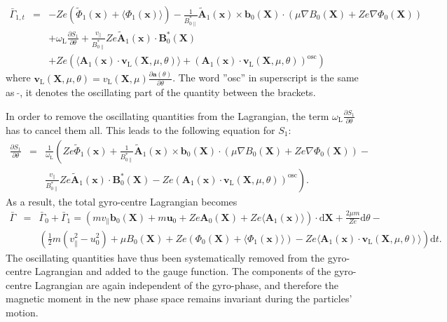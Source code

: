 \documentclass[a4paper,10pt]{article}
\newcommand{\st}[1]{\mathrm{#1}} %
\renewcommand{\vec}[1]{\mathbf{#1}}
\begin{document}
\begin{eqnarray*}
	\bar{\Gamma}_{1,t} &=& - Z e \left( \widetilde{\Phi}_1(\mathbf{x}) + \langle \Phi_1(\mathbf{x})\rangle \right) - \frac{1}{B_{0 \parallel}^{*}} \widetilde{\vec{A}}_1(\vec{x}) \times \mathbf{b}_0(\mathbf{X}) \cdot \left( \mu \nabla B_0(\mathbf{X}) + Z e \nabla \Phi_0(\mathbf{X})\right) \\ 
	&& + \omega_{\st{L}} \frac{\partial S_1}{\partial \theta} + \frac{v_{\parallel}}{B_{0 \parallel}^{*}} Z e \widetilde{\vec{A}}_1(\vec{x}) \cdot \mathbf{B}_0^{*}(\mathbf{X}) \\
	&& + Z e \left( \langle \mathbf{A}_1(\mathbf{x}) \cdot \vec{v}_{\st{L}}(\mathbf{X},\mu,\theta) \rangle  + \left( \mathbf{A}_1(\mathbf{x}) \cdot \vec{v}_{\st{L}}(\mathbf{X},\mu,\theta) \right)^{\st{osc}} \right)
\end{eqnarray*}
where $\vec{v}_{\st{L}}(\mathbf{X},\mu,\theta) = v_{\st{L}}(\mathbf{X},\mu) \frac{\partial \mathbf{a}(\theta)}{\partial \theta}$. The word ''osc'' in superscript is the same as $\ \widetilde{}$, it denotes the oscillating part of the quantity between the brackets. 

In order to remove the oscillating quantities from the Lagrangian, the term $\omega_{\st{L}} \frac{\partial S_1}{\partial \theta}$ has to cancel them all. This leads to the following equation for $S_1$:
\begin{eqnarray*}
	\frac{\partial S_1}{\partial \theta} &=& \frac{1}{\omega_{\st{L}}} \left( Z e \widetilde{\Phi}_1(\mathbf{x}) + \frac{1}{B_{0 \parallel}^{*}} \widetilde{\vec{A}}_1(\vec{x}) \times \mathbf{b}_0(\mathbf{X}) \cdot \left( \mu \nabla B_0(\mathbf{X}) + Z e \nabla \Phi_0(\mathbf{X})\right) - \right. \\
	&& \left. \frac{v_{\parallel}}{B_{0 \parallel}^{*}} Z e \widetilde{\vec{A}}_1(\vec{x}) \cdot \mathbf{B}_0^{*}(\mathbf{X}) - Z e \left( \mathbf{A}_1(\mathbf{x}) \cdot \vec{v}_{\st{L}}(\mathbf{X},\mu,\theta) \right)^{\st{osc}} \right).
\end{eqnarray*}
As a result, the total gyro-centre Lagrangian becomes
\begin{eqnarray}
	\bar{\Gamma} &=& \bar{\Gamma}_0 + \bar{\Gamma}_1 = \left( m v_{\parallel} \mathbf{b}_0(\mathbf{X}) + m \vec{u}_0 + Z e \mathbf{A}_0(\mathbf{X}) + Z e \langle \mathbf{A}_1(\mathbf{x}) \rangle \right) \cdot \mathrm{d} \mathbf{X} + \frac{2 \mu m}{Z e} \mathrm{d} \theta - \\
	&& \left( \frac{1}{2} m \left( v_{\parallel}^2 - u_0^2 \right) + \mu B_0(\mathbf{X}) + Z e \left( \Phi_0(\vec{X}) + \langle \Phi_1(\mathbf{x}) \rangle \right) - Z e \langle \mathbf{A}_1(\mathbf{x}) \cdot \vec{v}_{\st{L}}(\mathbf{X},\mu,\theta) \rangle \right) \mathrm{d}t. \nonumber
\end{eqnarray} 
The oscillating quantities have thus been systematically removed from the gyro-centre Lagrangian and added to the gauge function. The components of the gyro-centre Lagrangian are again independent of the gyro-phase, and therefore the magnetic moment in the new phase space remains invariant during the particles' motion. 
\end{document}
